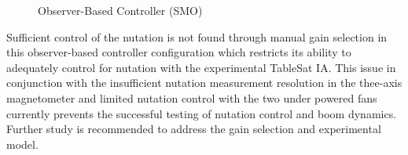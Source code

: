 \begin{figure}[H]
  \centerline{}
  \caption{Observer-Based Controller (SMO)}
  \label{fig:ObserverBasedControllerSMO}
\end{figure}

Sufficient control of the nutation is not found through manual gain selection in this observer-based controller configuration which restricts its ability to adequately control for nutation with the experimental TableSat IA.  This issue in conjunction with the insufficient nutation measurement resolution in the thee-axis magnetometer and limited nutation control with the two under powered fans currently prevents the successful testing of nutation control and boom dynamics.  Further study is recommended to address the gain selection and experimental model.

